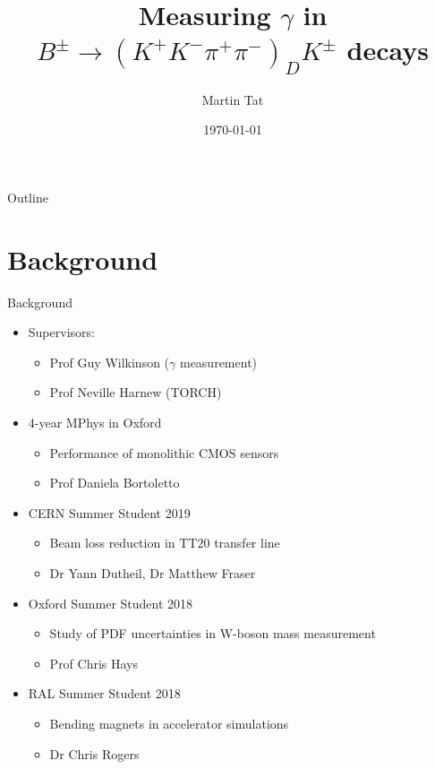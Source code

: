 \documentclass{beamer}
\title[$B^\pm\to(K^+K^-\pi^+\pi^-)_DK^\pm$]{Measuring \texorpdfstring{$\gamma$}{gamma} in \texorpdfstring{$B^\pm\to(K^+K^-\pi^+\pi^-)_DK^\pm$}{B to K+K-pi+pi-} decays}
\author{Martin Tat}
\institute{Oxford LHCb}
\date{\today}
\begin{document}
\begin{frame}
  \titlepage
\end{frame}

\begin{frame}{Outline}
  \tableofcontents
\end{frame}

\section{Background}
\begin{frame}{Background}
  \begin{itemize}
    \item Supervisors:
    \begin{itemize}
      \item{Prof Guy Wilkinson ($\gamma$ measurement)}
      \item{Prof Neville Harnew (TORCH)}
    \end{itemize}
    \item 4-year MPhys in Oxford
    \begin{itemize}
      \item Performance of monolithic CMOS sensors
      \item Prof Daniela Bortoletto
    \end{itemize}
    \item CERN Summer Student 2019
    \begin{itemize}
      \item Beam loss reduction in TT$20$ transfer line
      \item Dr Yann Dutheil, Dr Matthew Fraser
    \end{itemize}
    \item Oxford Summer Student 2018
    \begin{itemize}
      \item Study of PDF uncertainties in W-boson mass measurement
      \item Prof Chris Hays
    \end{itemize}
    \item RAL Summer Student 2018
    \begin{itemize}
      \item Bending magnets in accelerator simulations
      \item Dr Chris Rogers
    \end{itemize}
  \end{itemize}
\end{frame}
\end{document}
